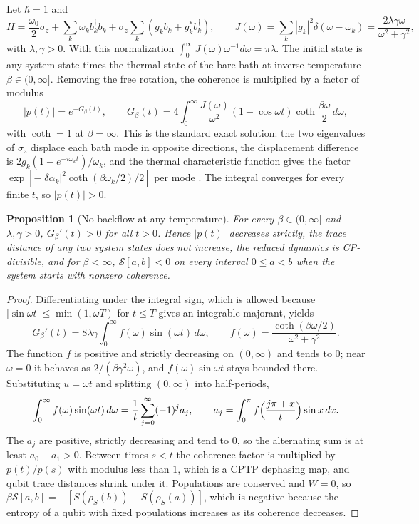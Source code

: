 \documentclass[12pt]{article}
\newtheorem{proposition}[theorem]{Proposition}
\begin{document}
Let $\hbar=1$ and
\begin{equation}
\label{eq:ld_model}
H=\frac{\omega_0}2\sigma_z+\sum_k\omega_kb_k^\dagger b_k+\sigma_z\sum_k(g_kb_k+g_k^*b_k^\dagger),\qquad
J(\omega)=\sum_k|g_k|^2\delta(\omega-\omega_k)=\frac{2\lambda\gamma\omega}{\omega^2+\gamma^2},
\end{equation}
with $\lambda,\gamma>0$. With this normalization $\int_0^\infty J(\omega)\omega^{-1}d\omega=\pi\lambda$. The initial state is any system state times the thermal state of the bare bath at inverse temperature $\beta\in(0,\infty]$. Removing the free rotation, the coherence is multiplied by a factor of modulus
\begin{equation}
\label{eq:ld_coherence}
|p(t)|=e^{-G_\beta(t)},\qquad
G_\beta(t)=4\int_0^\infty\frac{J(\omega)}{\omega^2}(1-\cos\omega t)\coth\frac{\beta\omega}2\,d\omega,
\end{equation}
with $\coth=1$ at $\beta=\infty$. This is the standard exact solution: the two eigenvalues of $\sigma_z$ displace each bath mode in opposite directions, the displacement difference is $2g_k(1-e^{-i\omega_kt})/\omega_k$, and the thermal characteristic function gives the factor $\exp[-|\delta\alpha_k|^2\coth(\beta\omega_k/2)/2]$ per mode \cite{BreuerPetruccione2002,SchallerAblassmayer2020}. The integral converges for every finite $t$, so $|p(t)|>0$.

\begin{proposition}[No backflow at any temperature]
\label{prop:ld_monotone}
For every $\beta\in(0,\infty]$ and $\lambda,\gamma>0$, $G_\beta'(t)>0$ for all $t>0$. Hence $|p(t)|$ decreases strictly, the trace distance of any two system states does not increase, the reduced dynamics is CP-divisible, and for $\beta<\infty$, $\mathcal S[a,b]<0$ on every interval $0\le a<b$ when the system starts with nonzero coherence.
\end{proposition}

\begin{proof}
Differentiating under the integral sign, which is allowed because $|\sin\omega t|\le\min(1,\omega T)$ for $t\le T$ gives an integrable majorant, yields
\[
G_\beta'(t)=8\lambda\gamma\int_0^\infty f(\omega)\sin(\omega t)\,d\omega,\qquad f(\omega)=\frac{\coth(\beta\omega/2)}{\omega^2+\gamma^2}.
\]
The function $f$ is positive and strictly decreasing on $(0,\infty)$ and tends to $0$; near $\omega=0$ it behaves as $2/(\beta\gamma^2\omega)$, and $f(\omega)\sin\omega t$ stays bounded there. Substituting $u=\omega t$ and splitting $(0,\infty)$ into half-periods,
\[
\int_0^\infty f(\omega)\sin(\omega t)\,d\omega=\frac1t\sum_{j=0}^\infty(-1)^ja_j,\qquad a_j=\int_0^\pi f\Bigl(\frac{j\pi+x}t\Bigr)\sin x\,dx .
\]
The $a_j$ are positive, strictly decreasing and tend to $0$, so the alternating sum is at least $a_0-a_1>0$. Between times $s<t$ the coherence factor is multiplied by $p(t)/p(s)$ with modulus less than $1$, which is a CPTP dephasing map, and qubit trace distances shrink under it. Populations are conserved and $W=0$, so $\beta\mathcal S[a,b]=-[S(\rho_S(b))-S(\rho_S(a))]$, which is negative because the entropy of a qubit with fixed populations increases as its coherence decreases.
\end{proof}
\end{document}
